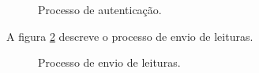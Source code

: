 \begin{figure}[ht!]
\begin{center}
\caption{Processo de autenticação.}
\label{fig:state_autenticacao}
\end{center}
\end{figure}

A figura \ref{fig:state_envio} descreve o processo de envio de leituras.

\begin{figure}[ht!]
\begin{center}
\caption{Processo de envio de leituras.}
\label{fig:state_envio}
\end{center}
\end{figure}

